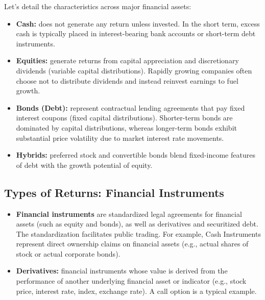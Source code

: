 
Let's detail the characteristics across major financial assets:
\begin{itemize}
	\item \textbf{Cash:} does not generate any return unless invested. In the short term, excess cash is typically placed in interest-bearing bank accounts or short-term debt instruments.
	\item \textbf{Equities:} generate returns from capital appreciation and discretionary dividends (variable capital distributions). Rapidly growing companies often choose not to distribute dividends and instead reinvest earnings to fuel growth.
	\item \textbf{Bonds (Debt):} represent contractual lending agreements that pay fixed interest coupons (fixed capital distributions). Shorter-term bonds are dominated by capital distributions, whereas longer-term bonds exhibit substantial price volatility due to market interest rate movements.
	\item \textbf{Hybrids:} preferred stock and convertible bonds blend fixed-income features of debt with the growth potential of equity.
\end{itemize}

\subsection{Types of Returns: Financial Instruments}
	\label{subsec:Types of Returns: Financial Instruments}
\begin{itemize}
	\item \textbf{Financial instruments} are standardized legal agreements for financial assets (such as equity and bonds), as well as derivatives and securitized debt. The standardization facilitates public trading. For example, Cash Instruments represent direct ownership claims on financial assets (e.g., actual shares of stock or actual corporate bonds).
	\item \textbf{Derivatives:} financial instruments whose value is derived from the performance of another underlying financial asset or indicator (e.g., stock price, interest rate, index, exchange rate). A call option is a typical example.
\end{itemize}

